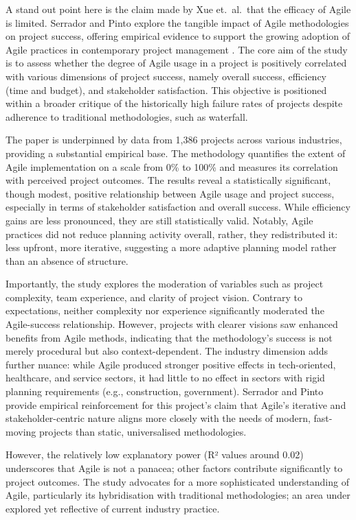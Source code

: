 \documentclass{report}
\begin{document}
A stand out point here is the claim made by Xue et.\ al.\ that the efficacy of Agile is limited. 
Serrador and Pinto explore the tangible impact of Agile methodologies on project success, offering empirical evidence to support the growing adoption of Agile practices in contemporary project management \parencite{serradorDoesAgileWork2015}. 
The core aim of the study is to assess whether the degree of Agile usage in a project is positively correlated with various dimensions of project success, namely overall success, efficiency (time and budget), and stakeholder satisfaction. 
This objective is positioned within a broader critique of the historically high failure rates of projects despite adherence to traditional methodologies, such as waterfall.

The paper is underpinned by data from 1,386 projects across various industries, providing a substantial empirical base. 
The methodology quantifies the extent of Agile implementation on a scale from 0\% to 100\% and measures its correlation with perceived project outcomes. 
The results reveal a statistically significant, though modest, positive relationship between Agile usage and project success, especially in terms of stakeholder satisfaction and overall success. 
While efficiency gains are less pronounced, they are still statistically valid. Notably, Agile practices did not reduce planning activity overall, rather, they redistributed it: less upfront, more iterative, suggesting a more adaptive planning model rather than an absence of structure.

Importantly, the study explores the moderation of variables such as project complexity, team experience, and clarity of project vision. 
Contrary to expectations, neither complexity nor experience significantly moderated the Agile-success relationship. 
However, projects with clearer visions saw enhanced benefits from Agile methods, indicating that the methodology's success is not merely procedural but also context-dependent. 
The industry dimension adds further nuance: while Agile produced stronger positive effects in tech-oriented, healthcare, and service sectors, it had little to no effect in sectors with rigid planning requirements (e.g., construction, government). 
Serrador and Pinto provide empirical reinforcement for this project's claim that Agile's iterative and stakeholder-centric nature aligns more closely with the needs of modern, fast-moving projects than static, universalised methodologies.

However, the relatively low explanatory power (R² values around 0.02) underscores that Agile is not a panacea; other factors contribute significantly to project outcomes. 
The study advocates for a more sophisticated understanding of Agile, particularly its hybridisation with traditional methodologies; an area under explored yet reflective of current industry practice.
\end{document}
